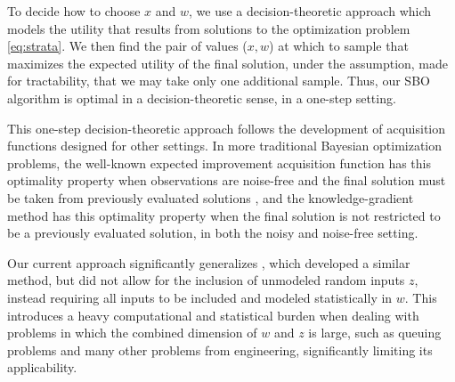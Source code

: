 \documentclass{article} %
\newcommand{\w}{w}
\newcommand{\z}{z}
\begin{document}
To decide how to choose $x$ and $\w$, we use a decision-theoretic approach which models the utility that results from solutions to the optimization problem \eqref{eq:strata}.  We then find the pair of values ($x,\w$) at which to sample that maximizes the expected utility of the final solution, under the assumption, made for tractability, that we may take only one additional sample.  Thus, our SBO algorithm is optimal in a decision-theoretic sense, in a one-step setting.

This one-step decision-theoretic approach follows the development of acquisition functions designed for other settings.  In more traditional Bayesian optimization problems, the well-known expected improvement acquisition function \cite{Mockus:1989,jones1998efficient} has this optimality property when observations are noise-free and the final solution must be taken from previously evaluated solutions \cite{Frazier:bayesianOpt}, and the knowledge-gradient method \cite{frazier2009knowledge,scott2011correlated} has this optimality property when the final solution is not restricted to be a previously evaluated solution, in both the noisy and noise-free setting.



Our current approach significantly generalizes \cite{Xie:2012:blind}, which developed a similar method, but did not allow for the inclusion of unmodeled random inputs $\z$, instead requiring all inputs to be included and modeled statistically in $\w$.  This introduces a heavy computational and statistical burden when dealing with problems in which the combined dimension of $\w$ and $\z$ is large, such as queuing problems and many other problems from engineering, significantly limiting its applicability.


\end{document}
